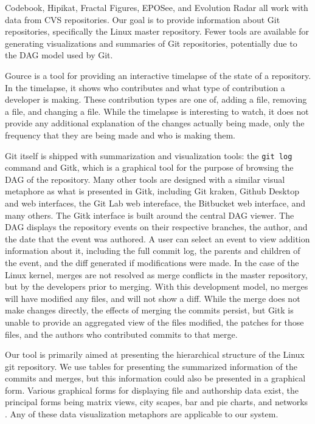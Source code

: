 Codebook, Hipikat, Fractal Figures, EPOSee, and Evolution Radar all work
with data from CVS repositories. Our goal is to provide information
about Git repositories, specifically the Linux master repository. Fewer
tools are available for generating visualizations and summaries of Git
repositories, potentially due to the DAG model used by Git.

Gource is a tool for providing an interactive timelapse of the state of
a repository\cite{Caudwell2010}. In the timelapse, it shows who
contributes and what type of contribution a developer is making. These
contribution types are one of, adding a file, removing a file, and
changing a file. While the timelapse is interesting to watch, it does
not provide any additional explanation of the changes actually being
made, only the frequency that they are being made and who is making
them.



Git itself is shipped with summarization and visualization tools:
the \verb|git log| command and Gitk, which is a graphical tool for the purpose of browsing
the DAG of the repository.
Many other tools are designed with a similar visual metaphore
as what is presented in Gitk, including Git kraken, Github Desktop and
web interfaces, the Git Lab web intereface, the Bitbucket web interface,
and many others. The Gitk interface is built around the central DAG
viewer. The DAG displays the repository events on their respective
branches, the author, and the date that the event was authored. A user
can select an event to view addition information about it, including the
full commit log, the parents and children of the event, and the diff
generated if modifications were made. In the case of the Linux kernel,
merges are not resolved as merge conflicts in the master repository, but
by the developers prior to merging. With this development model, no
merges will have modified any files, and will not show a diff. While the
merge does not make changes directly, the effects of merging the
commits persist, but Gitk is unable to provide an aggregated view of the
files modified, the patches for those files, and the authors who
contributed commits to that merge.

Our tool is primarily aimed at presenting the hierarchical structure of
the Linux git repository. We use tables for presenting the summarized
information of the commits and merges, but this information could also
be presented in a graphical form. Various graphical forms for displaying
file and authorship data exist, the principal forms being matrix views,
city scapes, bar and pie charts, and networks \cite{Eick2002}. Any of
these data visualization metaphors are applicable to our system.

